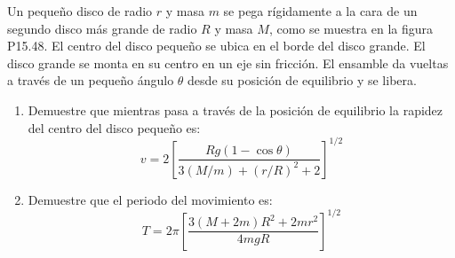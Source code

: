 \item Un pequeño disco de radio $r$ y masa $m$ se pega rígidamente a la cara de un segundo disco más grande de radio $R$ y masa $M$, como se muestra en la figura P15.48. El centro del disco pequeño se ubica en el borde del disco grande. El disco grande se monta en su centro en un eje sin fricción. El ensamble da vueltas a través de un pequeño ángulo $\theta$ desde su posición de equilibrio y se libera.
\begin{enumerate}
    \item Demuestre que mientras pasa a través de la posición de equilibrio la rapidez del centro del disco pequeño es:
    $$ v = 2 \left[ \frac{Rg(1 - \cos\theta)}{3(M/m) + (r/R)^2 + 2} \right]^{1/2} $$
    \item Demuestre que el periodo del movimiento es:
    $$ T = 2\pi \left[ \frac{3(M + 2m)R^2 + 2mr^2}{4mgR} \right]^{1/2} $$
\end{enumerate}